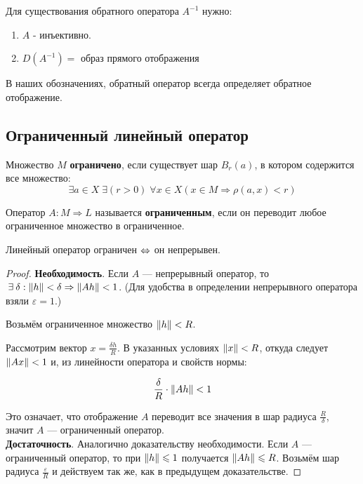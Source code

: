 \documentclass[12pt]{article}
\begin{document}
	Для существования обратного оператора $A^{-1}$ нужно:
	\begin{enumerate}
		\item $A$ - инъективно.
		\item $D(A^{-1}) = $ образ прямого отображения
	\end{enumerate}
	В наших обозначениях, обратный оператор всегда определяет обратное отображение. 

	\subsection{Ограниченный линейный оператор}	
	
		\begin{defi}
			Множество $M$ \textbf{ограничено}, если существует шар $B_r(a)$, в котором содержится все множество:
			$$ \exists a \in X \; \exists (r > 0) \; \forall x \in X (x \in M \Rightarrow \rho(a, x) < r) $$
		\end{defi}
		\begin{defi}
			Оператор $A: M \Rightarrow L$ называется \textbf{ограниченным}, если он переводит любое ограниченное множество
			в ограниченное.
		\end{defi}
	
		\begin{state}
			Линейный оператор ограничен $\Leftrightarrow$ он непрерывен.
		\end{state}
		\begin{proof}
			\textbf{Необходимость}. Если $A$ --- непрерывный оператор, то 
			$ \exists \delta : \norm{h} < \delta \Rightarrow \norm{Ah} < 1 $. (Для удобства в определении 
			непрерывного оператора взяли $\varepsilon = 1$.)
			
			Возьмём ограниченное множество $\left\| h \right\| < R$.
		
			Рассмотрим вектор $x = \frac{\delta h}{R}$. В указанных условиях
			$\left\| x \right\| < R$, откуда следует $\left\| Ax \right\| < 1$ и, из линейности оператора и свойств нормы:

			$$\frac{\delta}{R} \cdot \left\| Ah \right\| < 1$$

			Это означает, что отображение $A$ переводит все значения в шар радиуса $\frac{R}{\delta}$, значит
			$A$ --- ограниченный оператор. \\
		
			\textbf{Достаточность}. Аналогично доказательству необходимости. Если $A$ --- ограниченный оператор,
			то при $\left\| h \right\| \leqslant 1$ получается $\left\| Ah \right\| \leqslant R$. Возьмём шар радиуса $\frac{\varepsilon}{R}$
			и действуем так же, как в предыдущем доказательстве.
		\end{proof}
	
\end{document}
